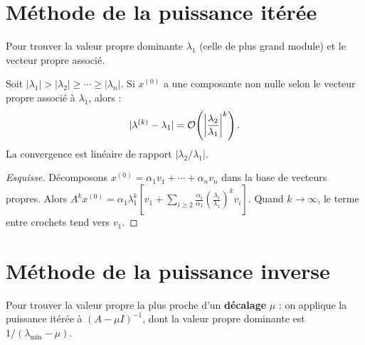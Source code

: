 \section{M\'ethode de la puissance it\'er\'ee}

\begin{definition}
Pour trouver la valeur propre dominante $\lambda_1$ (celle de plus grand module) et le vecteur propre associ\'e.
\end{definition}

\begin{algorithm}[H]
\caption{Puissance it\'er\'ee}\label{alg:puissance}
\end{algorithm}

\begin{theoreme}
Soit $|\lambda_1|>|\lambda_2|\geq\cdots\geq|\lambda_n|$. Si $x^{(0)}$ a une composante non nulle selon le vecteur propre associ\'e \`a $\lambda_1$, alors :
\[
|\lambda^{(k)}-\lambda_1| = \mathcal{O}\!\left(\left|\frac{\lambda_2}{\lambda_1}\right|^k\right).
\]
La convergence est lin\'eaire de rapport $|\lambda_2/\lambda_1|$.
\end{theoreme}

\begin{proof}[Esquisse]
D\'ecomposons $x^{(0)}=\alpha_1 v_1+\cdots+\alpha_n v_n$ dans la base de vecteurs propres. Alors $A^k x^{(0)}=\alpha_1\lambda_1^k\left[v_1+\sum_{i\geq 2}\frac{\alpha_i}{\alpha_1}\left(\frac{\lambda_i}{\lambda_1}\right)^k v_i\right]$. Quand $k\to\infty$, le terme entre crochets tend vers $v_1$.
\end{proof}

\section{M\'ethode de la puissance inverse}

\begin{definition}
Pour trouver la valeur propre la plus proche d'un \textbf{d\'ecalage} $\mu$ : on applique la puissance it\'er\'ee \`a $(A-\mu I)^{-1}$, dont la valeur propre dominante est $1/(\lambda_{\min}-\mu)$.
\end{definition}

